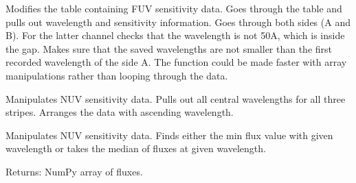 \documentclass[letterpaper,10pt,english]{sphinxmanual}
\begin{document}

\begin{fulllineitems}
\label{SamPy.plot.COSIHB:SamPy.plot.COSIHB.wrapper_OLD.FUVSensitivityDataMod}
Modifies the table containing FUV sensitivity data. Goes through the table and
pulls out wavelength and sensitivity information. Goes through both sides (A and B).
For the latter channel checks that the wavelength is not 50A, which is inside the gap.
Makes sure that the saved wavelengths are not smaller than the first recorded  wavelength
of the side A.
The function could be made faster with array manipulations rather than looping
through the data.

\end{fulllineitems}



\begin{fulllineitems}
\label{SamPy.plot.COSIHB:SamPy.plot.COSIHB.wrapper_OLD.NUVSensitivityDataMod}
Manipulates NUV sensitivity data. Pulls out all central wavelengths for all three
stripes. Arranges the data with ascending wavelength.

\end{fulllineitems}



\begin{fulllineitems}
\label{SamPy.plot.COSIHB:SamPy.plot.COSIHB.wrapper_OLD.NUVSensitivityDataMod2}
Manipulates NUV sensitivity data. Finds either the min flux value with given wavelength
or takes the median of fluxes at given wavelength.

\end{fulllineitems}



\begin{fulllineitems}
\label{SamPy.plot.COSIHB:SamPy.plot.COSIHB.wrapper_OLD.STMagToFlux}
Returns:
NumPy array of fluxes.

\end{fulllineitems}
\end{document}

